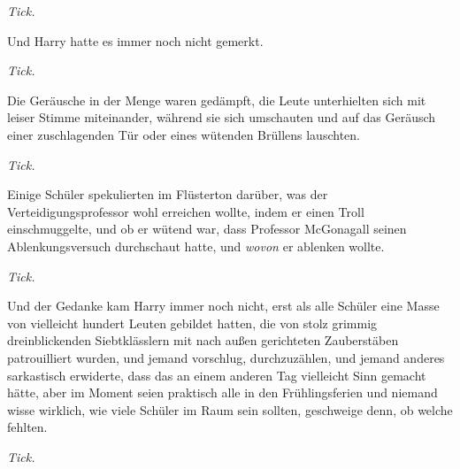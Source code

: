 \emph{Tick.}

Und Harry hatte es immer noch nicht gemerkt.

\emph{Tick.}

Die Geräusche in der Menge waren gedämpft, die Leute unterhielten sich mit leiser Stimme miteinander, während sie sich umschauten und auf das Geräusch einer zuschlagenden Tür oder eines wütenden Brüllens lauschten.

\emph{Tick.}

Einige Schüler spekulierten im Flüsterton darüber, was der Verteidigungsprofessor wohl erreichen wollte, indem er einen Troll einschmuggelte, und ob er wütend war, dass Professor McGonagall seinen Ablenkungsversuch durchschaut hatte, und \emph{wovon} er ablenken wollte.

\emph{Tick.}

Und der Gedanke kam Harry immer noch nicht, erst als alle Schüler eine Masse von vielleicht hundert Leuten gebildet hatten, die von stolz grimmig dreinblickenden Siebtklässlern mit nach außen gerichteten Zauberstäben patrouilliert wurden, und jemand vorschlug, durchzuzählen, und jemand anderes sarkastisch erwiderte, dass das an einem anderen Tag vielleicht Sinn gemacht hätte, aber im Moment seien praktisch alle in den Frühlingsferien und niemand wisse wirklich, wie viele Schüler im Raum sein sollten, geschweige denn, ob welche fehlten.

\emph{Tick.}


